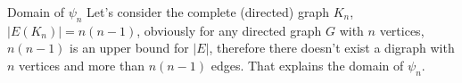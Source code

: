 \documentclass{beamer}
\begin{document}
\begin{frame}{}
    \begin{block}{Domain of $\psi_n$}
        \justifying
        Let's consider the complete (directed) graph $K_n$, $|E(K_n)| = n(n-1)$, obviously for any directed graph $G$ with $n$ vertices, $n(n-1)$ is an upper bound for $|E|$, therefore there doesn't exist a digraph with $n$ vertices and more than $n(n-1)$ edges. That explains the domain of $\psi_n$.
    \end{block}
    
    \begin{block}
        
    \end{block}
    
    
    
    
\end{frame}
\end{document}
